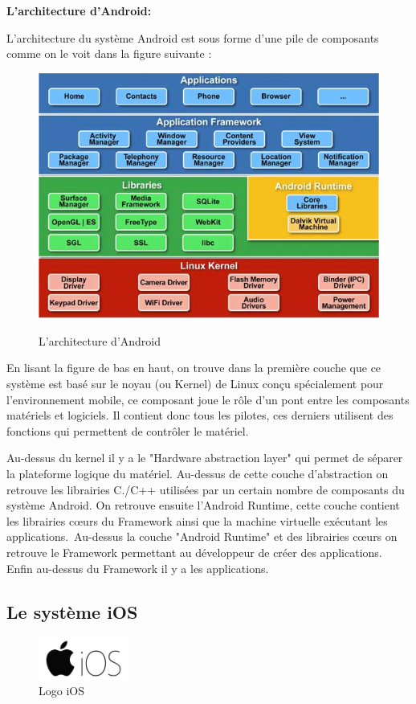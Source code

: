 \newpage
\tab \textbf{L'architecture d'Android:}\medskip

L'architecture du système Android est sous forme d'une pile de composants comme on le voit dans la figure suivante :
\begin{figure}[!ht]
    \centering
    \includegraphics[width=5in]{images/Chapitre1/android_architecture.jpg}
    \label{fig:architecture android}
    \caption{L'architecture d'Android}
\end{figure}

En lisant la figure de bas en haut, on trouve dans la première couche que ce système est basé sur le noyau (ou Kernel) de Linux conçu spécialement pour l'environnement mobile, ce composant joue le rôle d'un pont entre les composants matériels et logiciels. Il contient donc tous les pilotes, ces derniers utilisent des fonctions qui permettent de contrôler le matériel.

Au-dessus du kernel il y a le "Hardware abstraction layer" qui permet de séparer la plateforme logique du matériel. Au-dessus de cette couche d'abstraction on retrouve les librairies C./C++ utilisées par un certain nombre de composants du système Android.
On retrouve ensuite l'Android Runtime, cette couche contient les librairies cœurs du Framework ainsi que la machine virtuelle exécutant les applications. Au-dessus la couche "Android Runtime" et des librairies cœurs on retrouve le Framework permettant au développeur de créer des applications.
Enfin au-dessus du Framework il y a les applications.

\subsection{Le système iOS}
\begin{figure}
    \vspace{-15pt}
    \includegraphics[width=3cm]{images/Chapitre1/ios_logo.jpg}
    \vspace{-20pt}
    \caption{{\footnotesize Logo iOS}}
\end{figure}

